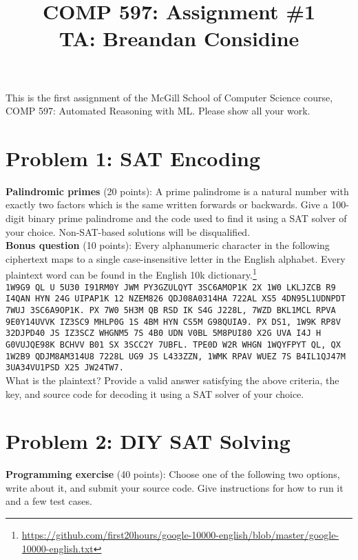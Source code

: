 \documentclass[11pt]{article}
\title{COMP 597: Assignment \#1\\\vspace{10pt}\small{TA: Breandan Considine}}
\begin{document}
    \maketitle
    \noindent This is the first assignment of the McGill School of Computer Science course, COMP 597: Automated Reasoning with ML. Please show all your work.

    \section{Problem 1: SAT Encoding}

    \noindent \textbf{Palindromic primes} (20 points): A prime palindrome is a natural number with exactly two factors which is the same written forwards or backwards. Give a 100-digit binary prime palindrome and the code used to find it using a SAT solver of your choice. Non-SAT-based solutions will be disqualified.\\

    \noindent \textbf{Bonus question} (10 points): Every alphanumeric character in the following ciphertext maps to a single case-insensitive letter in the English alphabet. Every plaintext word can be found in the English 10k dictionary.\footnote{\url{https://github.com/first20hours/google-10000-english/blob/master/google-10000-english.txt}}\\

    \noindent \texttt{1W9G9 QL U 5U30 I91RM0Y JWM PY3GZULQYT 3SC6AMOP1K 2X 1W0 LKLJZCB R9 I4QAN HYN 24G UIPAP1K 12 NZEM826 QDJ08A0314HA 722AL XS5 4DN95L1UDNPDT 7WUJ 3SC6A9OP1K. PX 7W0 5H3M QB RSD IK S4G J228L, 7WZD BKL1MCL RPVA 9E0Y14UVVK IZ3SC9 MHLP0G 1S 4BM HYN CS5M G98QUIA9. PX DS1, 1W9K RP8V 32DJPD40 JS IZ3SCZ WHGNM5 7S 4B0 UDN V0BL 5M8PUI80 X2G UVA I4J H G0VUJQE98K BCHVV B01 SX 3SCC2Y 7UBFL. TPE0D W2R WHGN 1WQYFPYT QL, QX 1W2B9 QDJM8AM314U8 7228L UG9 JS L433ZZN, 1WMK RPAV WUEZ 7S B4IL1QJ47M 3UA34VU1PSD X25 JW24TW7.}\\

    \noindent What is the plaintext? Provide a valid answer satisfying the above criteria, the key, and source code for decoding it using a SAT solver of your choice.

    \pagebreak\section{Problem 2: DIY SAT Solving}

    \noindent \textbf{Programming exercise} (40 points): Choose one of the following two options, write about it, and submit your source code. Give instructions for how to run it and a few test cases.
\end{document}
